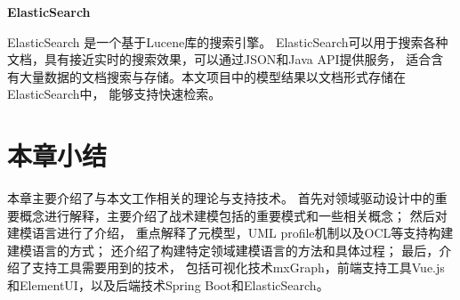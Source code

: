 \textbf{ElasticSearch}

ElasticSearch\footnotemark[9]
是一个基于Lucene\cite{bialecki2012apache}库的搜索引擎。
ElasticSearch可以用于搜索各种文档，具有接近实时的搜索效果，可以通过JSON和Java API提供服务，
适合含有大量数据的文档搜索与存储。本文项目中的模型结果以文档形式存储在ElasticSearch中，
能够支持快速检索。

\section{本章小结}

本章主要介绍了与本文工作相关的理论与支持技术。
首先对领域驱动设计中的重要概念进行解释，主要介绍了战术建模包括的重要模式和一些相关概念；
然后对建模语言进行了介绍，
重点解释了元模型，UML profile机制以及OCL等支持构建建模语言的方式；
还介绍了构建特定领域建模语言的方法和具体过程；
最后，介绍了支持工具需要用到的技术，
包括可视化技术mxGraph，前端支持工具Vue.js和ElementUI，以及后端技术Spring Boot和ElasticSearch。






